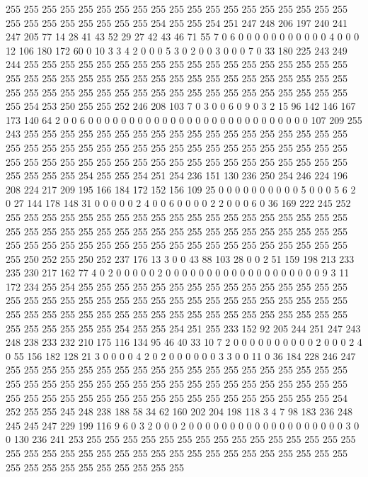 255 255 255 255 255 255 255 255 255 255 255 255 255 255 255 255 255 255 255 255
255 255 255 255 255 255 255 254 255 255 254 251 247 248 206 197 240 241 247 205
77 14 28 41 43 52 29 27 42 43 46 71 55 7 0 6 0 0 0 0
0 0 0 0 0 0 0 4 0 0 0 12 106 180 172 60 0 10 3 3
4 2 0 0 0 5 3 0 2 0 0 3 0 0 0 7 0 33 180 225
243 249 244 255 255 255 255 255 255 255 255 255 255 255 255 255 255 255 255 255
255 255 255 255 255 255 255 255 255 255 255 255 255 255 255 255 255 255 255 255
255 255 255 255 255 255 255 255 255 255 255 255 255 255 255 255 255 255 255 255
254 253 250 255 255 252 246 208 103 7 0 3 0 0 6 0 9 0 3 2
15 96 142 146 167 173 140 64 2 0 0 6 0 0 0 0 0 0 0 0
0 0 0 0 0 0 0 0 0 0 0 0 0 0 0 0 0 0 0 107
209 255 243 255 255 255 255 255 255 255 255 255 255 255 255 255 255 255 255 255
255 255 255 255 255 255 255 255 255 255 255 255 255 255 255 255 255 255 255 255
255 255 255 255 255 255 255 255 255 255 255 255 255 255 255 255 255 255 255 255
255 255 255 254 255 255 254 251 254 236 151 130 236 250 254 246 224 196 208 224
217 209 195 166 184 172 152 156 109 25 0 0 0 0 0 0 0 0 0 0
5 0 0 0 5 6 2 0 27 144 178 148 31 0 0 0 0 0 2 4
0 0 6 0 0 0 0 2 2 0 0 0 6 0 36 169 222 245 252 255
255 255 255 255 255 255 255 255 255 255 255 255 255 255 255 255 255 255 255 255
255 255 255 255 255 255 255 255 255 255 255 255 255 255 255 255 255 255 255 255
255 255 255 255 255 255 255 255 255 255 255 255 255 255 255 255 255 250 252 255
250 252 237 176 13 3 0 0 43 88 103 28 0 0 2 51 159 198 213 233
235 230 217 162 77 4 0 2 0 0 0 0 0 2 0 0 0 0 0 0
0 0 0 0 0 0 0 0 0 0 0 0 0 9 3 11 172 234 255 254
255 255 255 255 255 255 255 255 255 255 255 255 255 255 255 255 255 255 255 255
255 255 255 255 255 255 255 255 255 255 255 255 255 255 255 255 255 255 255 255
255 255 255 255 255 255 255 255 255 255 255 255 255 255 255 255 255 255 255 254
255 255 254 251 255 233 152 92 205 244 251 247 243 248 238 233 232 210 175 116
134 95 46 40 33 10 7 2 0 0 0 0 0 0 0 0 0 0 2 0
0 0 2 4 0 55 156 182 128 21 3 0 0 0 0 4 2 0 2 0
0 0 0 0 0 3 3 0 0 11 0 36 184 228 246 247 255 255 255 255
255 255 255 255 255 255 255 255 255 255 255 255 255 255 255 255 255 255 255 255
255 255 255 255 255 255 255 255 255 255 255 255 255 255 255 255 255 255 255 255
255 255 255 255 255 255 255 255 255 255 255 255 254 252 255 255 245 248 238 188
58 34 62 160 202 204 198 118 3 4 7 98 183 236 248 245 245 247 229 199
116 9 6 0 3 2 0 0 0 2 0 0 0 0 0 0 0 0 0 0
0 0 0 0 0 0 0 0 0 3 0 0 130 236 241 253 255 255 255 255
255 255 255 255 255 255 255 255 255 255 255 255 255 255 255 255 255 255 255 255
255 255 255 255 255 255 255 255 255 255 255 255 255 255 255 255 255 255 255 255
